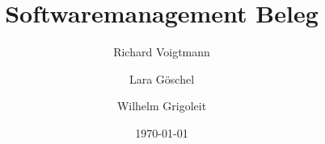 
\date{\today}	

\title{Softwaremanagement Beleg}
\author{
	Richard Voigtmann  \and 
	Lara Göschel  \and 
	Wilhelm Grigoleit }


\maketitle
